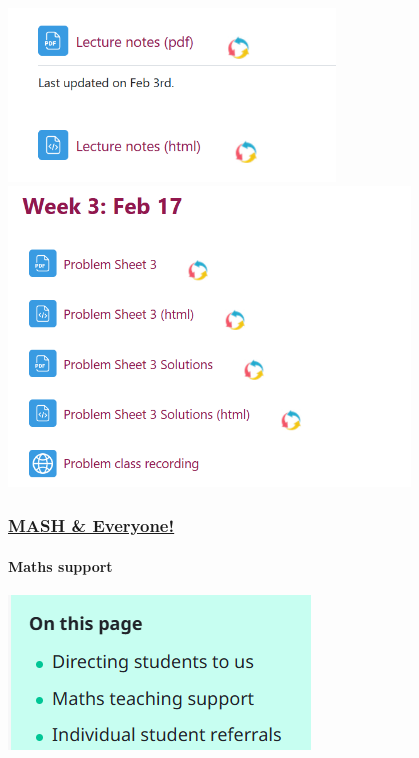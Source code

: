 \documentclass[
  letterpaper,
  DIV=11,
  numbers=noendperiod]{scrartcl}
\let\oldparagraph\paragraph
\renewcommand{\paragraph}[1]{\oldparagraph{#1}\mbox{}}
\begin{document}
\includegraphics[width=0.65\textwidth,height=\textheight]{./images/notes.png}\\
\includegraphics[width=0.8\textwidth,height=\textheight]{./images/sheets.png}\\

\subsubsection{\texorpdfstring{\href{./index.html\#mash-everyone}{MASH
\& Everyone!}}{MASH \& Everyone!}}\label{mash-everyone}

\paragraph{Maths support}\label{maths-support}

\includegraphics{./images/MASH.png}\\
\end{document}
